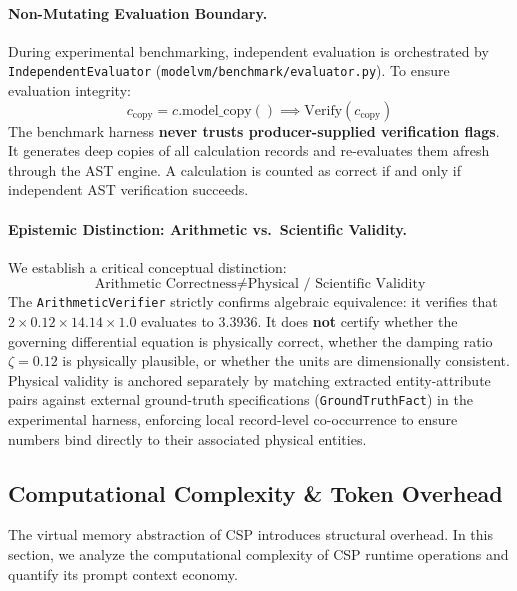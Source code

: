 \paragraph{Non-Mutating Evaluation Boundary.}
During experimental benchmarking, independent evaluation is orchestrated by \texttt{IndependentEvaluator} (\texttt{modelvm/benchmark/evaluator.py}). To ensure evaluation integrity:
\begin{equation}
c_{\text{copy}} = c.\text{model\_copy}() \implies \text{Verify}(c_{\text{copy}})
\end{equation}
The benchmark harness \textbf{never trusts producer-supplied verification flags}. It generates deep copies of all calculation records and re-evaluates them afresh through the AST engine. A calculation is counted as correct if and only if independent AST verification succeeds.

\paragraph{Epistemic Distinction: Arithmetic vs.\ Scientific Validity.}
We establish a critical conceptual distinction:
\begin{equation}
\text{Arithmetic Correctness} \neq \text{Physical / Scientific Validity}
\end{equation}
The \texttt{ArithmeticVerifier} strictly confirms algebraic equivalence: it verifies that $2 \times 0.12 \times 14.14 \times 1.0$ evaluates to $3.3936$. It does \textbf{not} certify whether the governing differential equation is physically correct, whether the damping ratio $\zeta = 0.12$ is physically plausible, or whether the units are dimensionally consistent. Physical validity is anchored separately by matching extracted entity-attribute pairs against external ground-truth specifications (\texttt{GroundTruthFact}) in the experimental harness, enforcing local record-level co-occurrence to ensure numbers bind directly to their associated physical entities.

\subsection{Computational Complexity \& Token Overhead}
\label{sec:complexity_overhead}

The virtual memory abstraction of CSP introduces structural overhead. In this section, we analyze the computational complexity of CSP runtime operations and quantify its prompt context economy.

